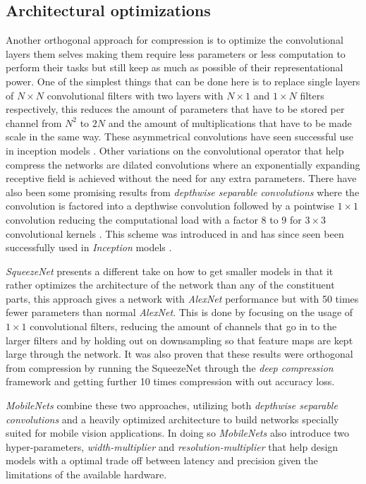 \documentclass{kththesis}
\newcommand{\bibentry}[1]{\parencite{#1}}
\begin{document}
\subsection{Architectural optimizations}
Another orthogonal approach for compression is to optimize the convolutional
layers them selves making them require less parameters or less computation to
perform their tasks but still keep as much as possible of their representational
power. One of the simplest things that can be done here is to replace single
layers of \(N \times N\) convolutional filters with two layers with \(N \times
1\) and \(1 \times N\) filters respectively, this reduces the amount of
parameters that have to be stored per channel from \(N^2\) to \(2N\) and the
amount of multiplications that have to be made scale in the same way. These
asymmetrical convolutions have seen successful use in inception models
\bibentry{szegedy2016rethinking}.  
Other variations on the convolutional operator that help compress the networks
are dilated convolutions \bibentry{yu2015multi} where an exponentially expanding
receptive field is achieved without the need for any extra parameters. There
have also been some promising results from \emph{depthwise separable
  convolutions} where the convolution is factored into a depthwise convolution
followed by a pointwise \(1 \times 1\) convolution reducing the computational
load with a factor \(8\) to \(9\) for \(3 \times 3\) convolutional kernels
\bibentry{howard2017mobilenets}. This scheme was introduced in
\bibentry{sifre2014rigid} and has since seen been successfully used in
\emph{Inception} models \bibentry{ioffe2015batch}.  

\emph{SqueezeNet} \bibentry{iandola2016squeezenet} presents a different take on
how to get smaller models in that it rather optimizes the architecture of the
network than any of the constituent parts, this approach gives a network with
\emph{AlexNet} performance but with 50 times fewer parameters than normal
\emph{AlexNet}. This is done by focusing on the usage of \(1 \times 1\)
convolutional filters, reducing the amount of channels that go in to the larger
filters and by holding out on downsampling so that feature maps are kept large
through the network. It was also proven that these results were orthogonal from
compression by running the SqueezeNet through the \emph{deep compression}
framework \bibentry{han2015deep} and getting further 10 times compression with
out accuracy loss. 

\emph{MobileNets} \bibentry{howard2017mobilenets} combine these two approaches,
utilizing both \emph{depthwise separable convolutions} and a heavily optimized
architecture to build networks specially suited for mobile vision applications.
In doing so \emph{MobileNets} also introduce two hyper-parameters,
\emph{width-multiplier} and \emph{resolution-multiplier} that help design models
with a optimal trade off between latency and precision given the limitations of
the available hardware. 
\end{document}
